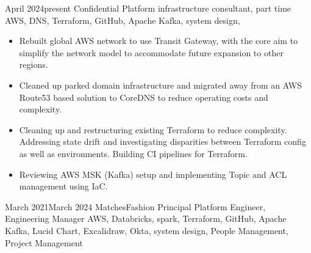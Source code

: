 \documentclass[10pt]{article} %
\begin{document}
\jobheader
{April 2024}{present}
{Confidential}
{Platform infrastructure consultant, part time}
{
      AWS, DNS, Terraform, GitHub, Apache Kafka, system design, 
}
{
  \begin{itemize}
      \item Rebuilt global AWS network to use Transit Gateway, with the core aim to simplify the network model to accommodate future expansion to other regions.

      \item Cleaned up parked domain infrastructure and migrated away from an AWS Route53 based solution to CoreDNS to reduce operating costs and complexity.

      \item Cleaning up and restructuring existing Terraform to reduce complexity. Addressing state drift and investigating disparities between Terraform config as well as environments. Building CI pipelines for Terraform.

      \item Reviewing AWS MSK (Kafka) setup and implementing Topic and ACL management using IaC.

\end{itemize}
}
\jobheader
{March 2021}{March 2024}
{MatchesFashion}
{Principal Platform Engineer, Engineering Manager}
{
      AWS, Databricks, spark, Terraform, GitHub, Apache Kafka, Lucid Chart, Excalidraw,
      Okta, system design, People Management, Project Management
}
\end{document}
